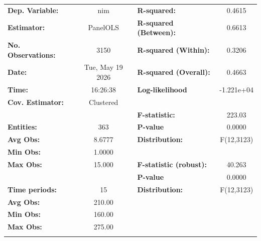 \begin{center}
\begin{tabular}{lclc}
\toprule
\textbf{Dep. Variable:}    &        nim         & \textbf{  R-squared:         }   &      0.4615      \\
\textbf{Estimator:}        &      PanelOLS      & \textbf{  R-squared (Between):}  &      0.6613      \\
\textbf{No. Observations:} &        3150        & \textbf{  R-squared (Within):}   &      0.3206      \\
\textbf{Date:}             &  Tue, May 19 2026  & \textbf{  R-squared (Overall):}  &      0.4663      \\
\textbf{Time:}             &      16:26:38      & \textbf{  Log-likelihood     }   &    -1.221e+04    \\
\textbf{Cov. Estimator:}   &     Clustered      & \textbf{                     }   &                  \\
\textbf{}                  &                    & \textbf{  F-statistic:       }   &      223.03      \\
\textbf{Entities:}         &        363         & \textbf{  P-value            }   &      0.0000      \\
\textbf{Avg Obs:}          &       8.6777       & \textbf{  Distribution:      }   &    F(12,3123)    \\
\textbf{Min Obs:}          &       1.0000       & \textbf{                     }   &                  \\
\textbf{Max Obs:}          &       15.000       & \textbf{  F-statistic (robust):} &      40.263      \\
\textbf{}                  &                    & \textbf{  P-value            }   &      0.0000      \\
\textbf{Time periods:}     &         15         & \textbf{  Distribution:      }   &    F(12,3123)    \\
\textbf{Avg Obs:}          &       210.00       & \textbf{                     }   &                  \\
\textbf{Min Obs:}          &       160.00       & \textbf{                     }   &                  \\
\textbf{Max Obs:}          &       275.00       & \textbf{                     }   &                  \\
\textbf{}                  &                    & \textbf{                     }   &                  \\
\bottomrule

\end{tabular}
\end{center}
